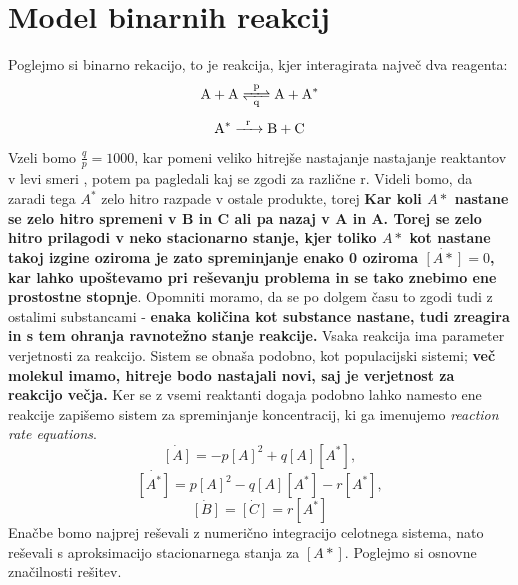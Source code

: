 \documentclass[11pt, a4paper]{article}
\begin{document}
\section{Model binarnih reakcij}
Poglejmo si binarno rekacijo, to je reakcija, kjer interagirata največ dva reagenta:
\begin{equation}
\ce{A + A <=>[\ce{p}][\ce{q}] A + A^*}
\end{equation}
\begin{equation}
\ce{A^* ->[\ce{r}] B + C}
\end{equation}
Vzeli bomo $\frac{q}{p}=1000$, kar pomeni veliko hitrejše nastajanje nastajanje reaktantov v levi smeri , potem pa pagledali kaj se zgodi za različne r. Videli bomo, da zaradi tega $A^*$ zelo hitro razpade v ostale produkte, torej \textbf{ Kar koli $A*$ nastane se zelo hitro spremeni v B in C ali pa nazaj v A in A. Torej se zelo hitro prilagodi v neko stacionarno stanje, kjer toliko $A*$ kot nastane takoj izgine oziroma je zato spreminjanje enako 0 oziroma $\dot{[A*]} = 0$, kar lahko upoštevamo pri reševanju problema in se tako znebimo ene prostostne stopnje}. Opomniti moramo, da se po dolgem času to zgodi tudi z ostalimi substancami - \textbf{ enaka količina kot substance nastane, tudi zreagira in s tem ohranja ravnotežno stanje reakcije.} \newline\newline Vsaka reakcija ima 
parameter verjetnosti za reakcijo. Sistem se obnaša podobno, kot populacijski sistemi; \textbf{več molekul imamo, hitreje bodo nastajali novi, saj je verjetnost za reakcijo večja.} Ker se z vsemi reaktanti dogaja podobno lahko namesto ene reakcije zapišemo sistem za spreminjanje koncentracij, ki ga imenujemo \textit{reaction rate equations}. 
\begin{equation}
\dot{[A]} = -p[A]^2+q[A][A^*],
\end{equation}
\begin{equation}
\dot{[A^*]} = p[A]^2-q[A][A^*]-r[A^*],
\end{equation}
\begin{equation}
\dot{[B]} = \dot{[C]}=r[A^*]
\end{equation}
Enačbe bomo najprej reševali z  numerično integracijo celotnega sistema, nato reševali s aproksimacijo stacionarnega stanja za $[A*]$. Poglejmo si osnovne značilnosti rešitev.\newline
\end{document}
